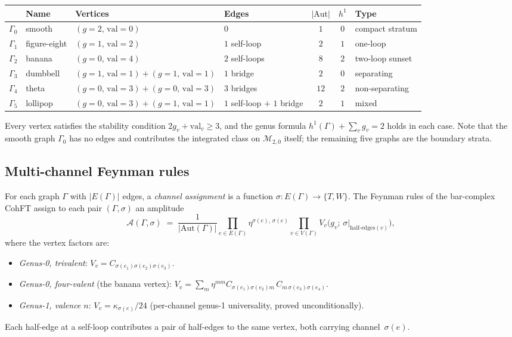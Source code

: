 \begin{center}
\small
\renewcommand{\arraystretch}{1.3}
\begin{tabular}{clllccl}
& \textbf{Name}
& \textbf{Vertices}
& \textbf{Edges}
& $|\mathrm{Aut}|$
& $h^1$
& \textbf{Type} \\
\hline
$\Gamma_0$ & smooth
 & $(g{=}2,\, \mathrm{val}{=}0)$
 & $0$
 & $1$ & $0$ & compact stratum \\[2pt]
$\Gamma_1$ & figure-eight
 & $(g{=}1,\, \mathrm{val}{=}2)$
 & $1$ self-loop
 & $2$ & $1$ & one-loop \\[2pt]
$\Gamma_2$ & banana
 & $(g{=}0,\, \mathrm{val}{=}4)$
 & $2$ self-loops
 & $8$ & $2$ & two-loop sunset \\[2pt]
$\Gamma_3$ & dumbbell
 & $(g{=}1,\, \mathrm{val}{=}1) + (g{=}1,\, \mathrm{val}{=}1)$
 & $1$ bridge
 & $2$ & $0$ & separating \\[2pt]
$\Gamma_4$ & theta
 & $(g{=}0,\, \mathrm{val}{=}3) + (g{=}0,\, \mathrm{val}{=}3)$
 & $3$ bridges
 & $12$ & $2$ & non-separating \\[2pt]
$\Gamma_5$ & lollipop
 & $(g{=}0,\, \mathrm{val}{=}3) + (g{=}1,\, \mathrm{val}{=}1)$
 & $1$ self-loop $+$ $1$ bridge
 & $2$ & $1$ & mixed
\end{tabular}
\end{center}
Every vertex satisfies the stability condition $2g_v + \mathrm{val}_v
\geq 3$, and the genus formula $h^1(\Gamma) + \sum_v g_v = 2$ holds
in each case. Note that the smooth graph $\Gamma_0$ has no edges and
contributes the integrated class on $\mathcal{M}_{2,0}$ itself; the
remaining five graphs are the boundary strata.


\subsection{Multi-channel Feynman rules}
\label{subsec:w3-feynman-rules}

For each graph $\Gamma$ with $|E(\Gamma)|$ edges, a \emph{channel
assignment} is a function $\sigma \colon E(\Gamma) \to \{T, W\}$.
The Feynman rules of the bar-complex CohFT assign to each pair
$(\Gamma, \sigma)$ an amplitude
\begin{equation}\label{eq:feynman-rule}
\mathcal{A}(\Gamma, \sigma)
\;=\;
\frac{1}{|\mathrm{Aut}(\Gamma)|}
\prod_{e \in E(\Gamma)} \eta^{\sigma(e),\, \sigma(e)}
\prod_{v \in V(\Gamma)} V_v\bigl(g_v;\, \sigma|_{\mathrm{half\text{-}edges}(v)}\bigr),
\end{equation}
where the vertex factors are:
\begin{itemize}
\item \emph{Genus-0, trivalent}: $V_v = C_{\sigma(e_1)\sigma(e_2)\sigma(e_3)}$.
\item \emph{Genus-0, four-valent} (the banana vertex):
 $V_v = \sum_m \eta^{mm} C_{\sigma(e_1)\sigma(e_2)m}\,
 C_{m\,\sigma(e_3)\sigma(e_4)}$.
\item \emph{Genus-1, valence $n$}:
 $V_v = \kappa_{\sigma(e)}/24$ (per-channel genus-1 universality,
 proved unconditionally).
\end{itemize}
Each half-edge at a self-loop contributes a pair of half-edges to
the same vertex, both carrying channel~$\sigma(e)$.


